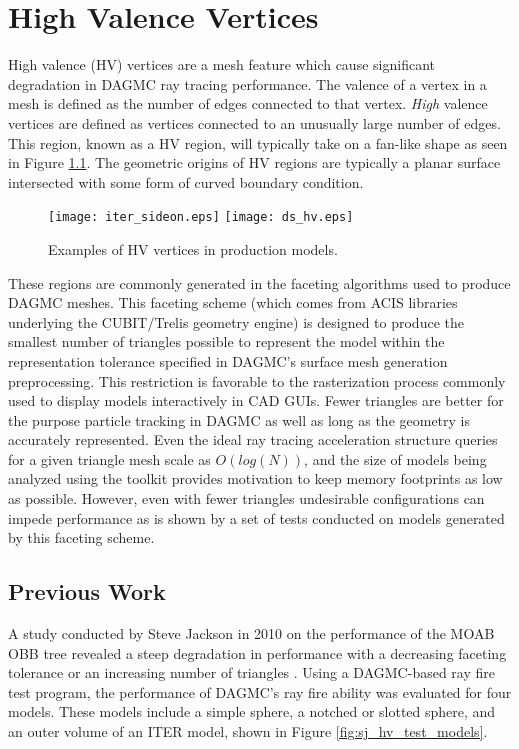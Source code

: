 
\chapter{High Valence Vertices}\label{ch:high_valence}

High valence (HV) vertices are a mesh feature which cause significant degradation in
DAGMC ray tracing performance. The valence of a vertex in a mesh is defined as
the number of edges connected to that vertex. \textit{High} valence vertices are
defined as vertices connected to an unusually large number of edges. This
region, known as a HV region, will typically take on a fan-like shape
as seen in Figure \ref{fig:hv_examples}.  The geometric origins of HV
regions are typically a planar surface intersected with some form of curved
boundary condition. 

\begin{figure}[H]
  \centering
  \texttt{[image: iter\_sideon.eps]}
  \texttt{[image: ds\_hv.eps]}
  \caption[Examples of HV vertices in production models.]{Examples of HV
    vertices in production models.}
  \label{fig:hv_examples}
\end{figure}

These regions are commonly generated in the faceting algorithms used to produce
DAGMC meshes. This faceting scheme (which comes from ACIS libraries underlying
the CUBIT/Trelis geometry engine) is designed to produce the smallest number of
triangles possible to represent the model within the representation tolerance
specified in DAGMC's surface mesh generation preprocessing. This restriction is
favorable to the rasterization process commonly used to display models
interactively in CAD GUIs. Fewer triangles are better for the purpose
particle tracking in DAGMC as well as long as the geometry is accurately
represented. Even the ideal ray tracing acceleration structure queries for a
given triangle mesh scale as $O(log(N))$, and the size of models being analyzed
using the toolkit provides motivation to keep memory footprints as low as
possible. However, even with fewer triangles undesirable configurations can
impede performance as is shown by a set of tests conducted on models generated
by this faceting scheme.

\section{Previous Work}

A study conducted by Steve Jackson in 2010 on the performance of the MOAB OBB
tree revealed a steep degradation in performance with a decreasing faceting
tolerance or an increasing number of triangles \cite{Tautges_2009}. Using a
DAGMC-based ray fire test program, the performance of DAGMC's ray fire ability
was evaluated for four models. These models include a simple sphere, a notched
or slotted sphere, and an outer volume of an ITER model, shown in Figure
\ref{fig:sj_hv_test_models}.


